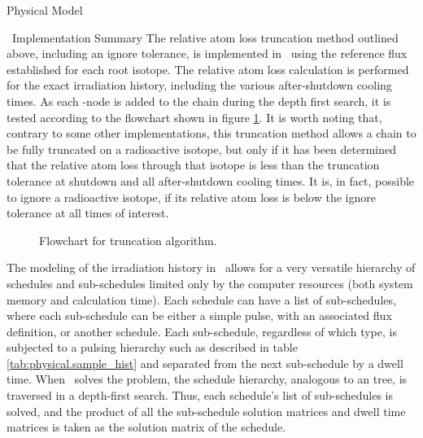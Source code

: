 \begin{chapter}{Physical Model\label{chap:physical}}
\begin{section}{\ALARA\  Implementation Summary\label{sec:physical.alara}}
  The relative atom loss truncation method outlined above, including
  an ignore tolerance, is implemented in \ALARA\  using the reference
  flux established for each root isotope.  The relative atom loss
  calculation is performed for the exact irradiation history,
  including the various after-shutdown cooling times.  As each
  \pc-node is added to the chain during the depth first search, it is
  tested according to the flowchart shown in figure
  \ref{fig:physical.trunc_flow}.  It is worth noting that, contrary to
  some other implementations\cite{DKRICF,DKRP}, this truncation method
  allows a chain to be fully truncated on a radioactive isotope, but
  only if it has been determined that the relative atom loss through
  that isotope is less than the truncation tolerance at shutdown and
  all after-shutdown cooling times.  It is, in fact, possible to
  ignore a radioactive isotope, if its relative atom loss is below the
  ignore tolerance at all times of interest.

  \begin{figure}[htbp]
    \begin{center}
      \leavevmode
      \caption{Flowchart for truncation algorithm.}
      \label{fig:physical.trunc_flow}
    \end{center}
  \end{figure}
  
  
  The modeling of the irradiation history in \ALARA\ allows for a very
  versatile hierarchy of schedules and sub-schedules limited only by
  the computer resources (both system memory and calculation time).
  Each schedule can have a list of sub-schedules, where each
  sub-schedule can be either a simple pulse, with an associated flux
  definition, or another schedule.  Each sub-schedule, regardless of
  which type, is subjected to a pulsing hierarchy such as described in
  table \ref{tab:physical.sample_hist} and separated from the next
  sub-schedule by a dwell time.  When \ALARA\ solves the problem, the
  schedule hierarchy, analogous to an \nary tree, is traversed in a
  depth-first search.  Thus, each schedule's list of sub-schedules is
  solved, and the product of all the sub-schedule solution matrices
  and dwell time matrices is taken as the solution matrix of the
  schedule.
  
\end{section}




\end{chapter}